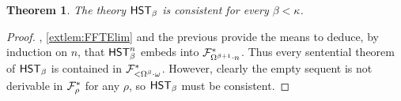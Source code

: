\documentclass[UKenglish,cleveref,DIV=12]{scrartcl}
\let\forall\forallAlt
\newtheorem{theorem}{Theorem}
\theoremstyle{definition}
\theoremstyle{definition}
\begin{document}
\begin{theorem}\label{extthm:FFconsis}
 The theory $\mathsf{HST}_\beta$ is consistent for every $\beta<\kappa$.
\end{theorem}
\begin{proof}
, \cref{extlem:FFTElim} and the previous  provide the means to deduce, by induction on $n$, that $\mathsf{HST}_\beta^n$ embeds into $\mathcal{F}^*_{\Omega^{\beta+1}\cdot n}$. Thus every sentential theorem of $\mathsf{HST}_\beta$ is contained in $\mathcal{F}^*_{<\Omega^\beta\cdot\omega}$. However, clearly the empty sequent is not derivable in $\mathcal{F}^*_\rho$ for any $\rho$, so $\mathsf{HST}_\beta$ must be consistent.
\end{proof}
%
\end{document}
